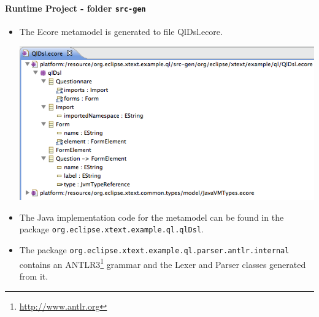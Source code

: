 \paragraph{Runtime Project - folder \texttt{src-gen}}
\begin{itemize}
  \item The Ecore metamodel is generated to file QlDsl.ecore.

\includegraphics[width=16cm]{./images/chapter01/QlDsl_ecore.png}

  \item The Java implementation code for the metamodel can be found in the
  package \texttt{org.eclipse.xtext.example.ql.qlDsl}.
  \item The package \texttt{org.eclipse.xtext.example.ql.parser.antlr.internal}
  contains an ANTLR3\footnote{\url{http://www.antlr.org}} grammar and the Lexer
  and Parser classes generated from it.
\end{itemize}

